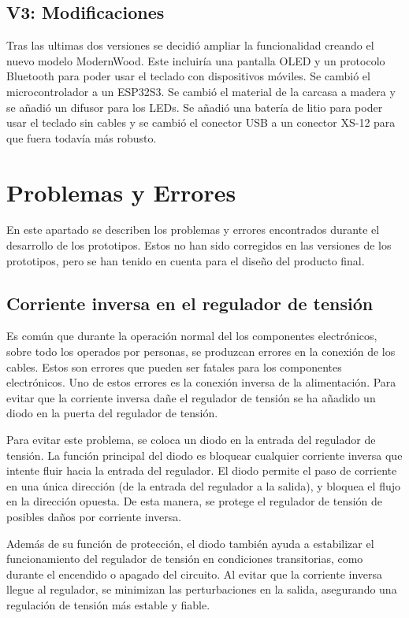 \subsection{V3: Modificaciones}
Tras las ultimas dos versiones se decidió ampliar la funcionalidad creando el nuevo modelo ModernWood. Este incluiría una pantalla \gls{OLED} y un protocolo \gls{Bluetooth} para poder usar el teclado con dispositivos móviles. Se cambió el microcontrolador a un ESP32S3. Se cambió el material de la carcasa a madera y se añadió un difusor para los \gls{LED}s. Se añadió una batería de litio para poder usar el teclado sin cables y se cambió el conector \gls{USB} a un conector XS-12 para que fuera todavía más robusto.

\section{Problemas y Errores} \label{Errores}
En este apartado se describen los problemas y errores encontrados durante el desarrollo de los prototipos. Estos no han sido corregidos en las versiones de los prototipos, pero se han tenido en cuenta para el diseño del producto final.
\subsection{Corriente inversa en el regulador de tensión} \label{CorrienteInversa}
Es común que durante la operación normal del los componentes electrónicos, sobre todo los operados por personas, se produzcan errores en la conexión de los cables. Estos son errores que pueden ser fatales para los componentes electrónicos. Uno de estos errores es la conexión inversa de la alimentación. Para evitar que la corriente inversa dañe el regulador de tensión se ha añadido un diodo en la puerta del regulador de tensión.

Para evitar este problema, se coloca un diodo en la entrada del regulador de tensión. La función principal del diodo es bloquear cualquier corriente inversa que intente fluir hacia la entrada del regulador. El diodo permite el paso de corriente en una única dirección (de la entrada del regulador a la salida), y bloquea el flujo en la dirección opuesta. De esta manera, se protege el regulador de tensión de posibles daños por corriente inversa.

Además de su función de protección, el diodo también ayuda a estabilizar el funcionamiento del regulador de tensión en condiciones transitorias, como durante el encendido o apagado del circuito. Al evitar que la corriente inversa llegue al regulador, se minimizan las perturbaciones en la salida, asegurando una regulación de tensión más estable y fiable.

